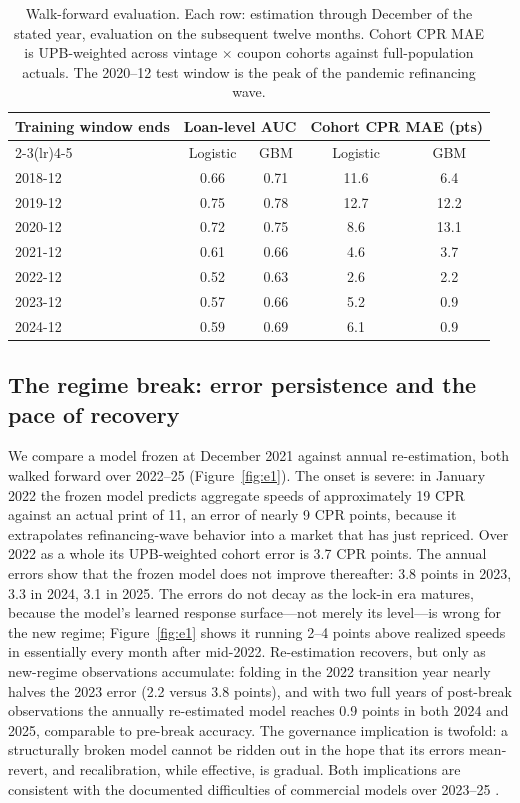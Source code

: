 \documentclass[11pt]{article}
\begin{document}
\begin{table}[ht]
\centering
\small
\begin{tabular}{lcccc}
\toprule
Training window ends & \multicolumn{2}{c}{Loan-level AUC} & \multicolumn{2}{c}{Cohort CPR MAE (pts)} \\
\cmidrule(lr){2-3}\cmidrule(lr){4-5}
 & Logistic & GBM & Logistic & GBM \\
\midrule
2018-12 & 0.66 & 0.71 & 11.6 & 6.4 \\
2019-12 & 0.75 & 0.78 & 12.7 & 12.2 \\
2020-12 & 0.72 & 0.75 & 8.6 & 13.1 \\
2021-12 & 0.61 & 0.66 & 4.6 & 3.7 \\
2022-12 & 0.52 & 0.63 & 2.6 & 2.2 \\
2023-12 & 0.57 & 0.66 & 5.2 & 0.9 \\
2024-12 & 0.59 & 0.69 & 6.1 & 0.9 \\
\bottomrule
\end{tabular}
\caption{Walk-forward evaluation. Each row: estimation through December of the stated year,
evaluation on the subsequent twelve months. Cohort CPR MAE is UPB-weighted across vintage
$\times$ coupon cohorts against full-population actuals. The 2020--12 test window is the peak of
the pandemic refinancing wave.}
\label{tab:walkforward}
\end{table}

\subsection{The regime break: error persistence and the pace of recovery}
\label{sec:e1}

We compare a model frozen at December 2021 against annual re-estimation, both walked forward over
2022--25 (Figure~\ref{fig:e1}). The onset is severe: in January 2022 the frozen model predicts
aggregate speeds of approximately 19 CPR against an actual print of 11, an error of nearly 9
CPR points, because it extrapolates refinancing-wave behavior into a market that has just
repriced. Over 2022 as a whole its UPB-weighted cohort error is 3.7 CPR points. The annual
errors show that the frozen model does not improve thereafter: 3.8 points in 2023, 3.3 in 2024,
3.1 in 2025. The errors do not decay as the lock-in
era matures, because the model's learned response surface---not merely its level---is wrong for
the new regime; Figure~\ref{fig:e1} shows it running 2--4 points above realized speeds in
essentially every month after mid-2022. Re-estimation recovers, but only as new-regime
observations accumulate: folding in the 2022 transition year nearly halves the 2023 error (2.2
versus 3.8 points), and with two full years of post-break observations the annually
re-estimated model reaches 0.9 points in both 2024 and 2025, comparable to pre-break accuracy.
The governance implication is twofold: a structurally broken model cannot be ridden out in the
hope that its errors mean-revert, and recalibration, while effective, is gradual. Both
implications are consistent with the documented difficulties of commercial models over 2023--25
\citep{yu2023uncharted, katz2024models}.
\end{document}
